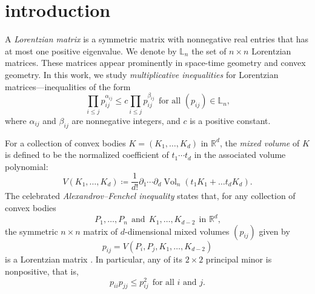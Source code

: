 \documentclass{amsart}
\theoremstyle{definition}
\theoremstyle{remark}
\def\RR{\mathbb{R}}
\def\L{\mathbb{L}}
\DeclareMathOperator{\Vol}{Vol}
\begin{document}

\section{introduction}

A \emph{Lorentzian matrix} is a symmetric matrix with nonnegative real entries that has at most one positive eigenvalue.
We denote by $\L_n$ the set of $n\times n$ Lorentzian matrices.
These matrices appear prominently in space-time geometry and convex geometry. In this work, we study \emph{multiplicative inequalities} for Lorentzian matrices---inequalities of the form
\[
\prod_{i \le j} p_{ij}^{\alpha_{ij}} \le c \prod_{i \le j} p_{ij}^{\beta_{ij}} \ \ \text{for all $(p_{ij}) \in \L_n$,}
\]
where $\alpha_{ij}$ and $\beta_{ij}$ are nonnegative integers, and $c$ is a positive constant.

For a collection of convex bodies $K=(K_1, \dots, K_d)$ in $\RR^d$, the \emph{mixed volume} of $K$ is defined to be the normalized coefficient of $t_1\cdots t_d$ in the associated volume polynomial:
\[
V(K_1, \dots, K_d)\coloneq \frac{1}{d!}\partial_1\cdots \partial_d \Vol_n(t_1K_1+\dots t_dK_d).
\]
The celebrated \emph{Alexandrov--Fenchel inequality} states that,
for any collection of convex bodies 
\[
 P_1,\ldots,P_n \ \ \text{and} \ \ K_1,\ldots,K_{d-2} \ \ \text{in $\RR^d$,}
\]
the symmetric $n \times n$ matrix of $d$-dimensional mixed volumes $(p_{ij})$ given by
\[
p_{ij}=V(P_i, P_j, K_1, \dots, K_{d-2}) %
\]
is a Lorentzian matrix \cite[Section 7.3]{Schneider}. In particular, any of its $2 \times 2$ principal minor is nonpositive, that is, 
\[
p_{ii}p_{jj} \le p_{ij}^2 \ \ \text{for all $i$ and $j$.}
\]
\end{document}
